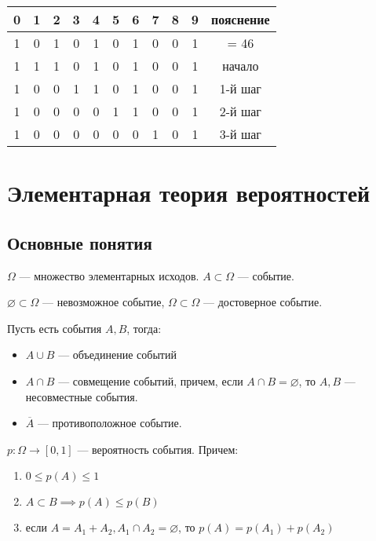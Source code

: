 \begin{eg}
    \begin{tabular}{|c|c|c|c|c|c|c|c|c|c|c|}
        \hline
        0 & 1 & 2 &3 &4&5&6&7&8&9& пояснение\\
        \hline
        1 & 0 & 1 & 0 & 1 & 0 & 1 & 0 & 0 & 1 & = 46\\
        1 & 1 & 1 & 0 & 1 & 0 & 1 & 0 & 0 & 1 & начало\\
        1 & 0 & 0 & 1 & 1 & 0 & 1 & 0 & 0 & 1 & 1-й шаг\\
        1 & 0 & 0 & 0 & 0 & 1 & 1 & 0 & 0 & 1 & 2-й шаг\\
        1 & 0 & 0 & 0 & 0 & 0 & 0 & 1 & 0 & 1 & 3-й шаг\\
        \hline        
    \end{tabular}
\end{eg}

\chapter{Элементарная теория вероятностей}

\section{Основные понятия}
\begin{definition}
    $\Omega$ --- множество элементарных исходов. $A \subset \Omega$ --- событие.
\end{definition}

\begin{definition}
    $\varnothing \subset \Omega$ --- невозможное событие, $\Omega \subset \Omega$ --- достоверное событие.
\end{definition}

\begin{definition}
    Пусть есть события $A, B$, тогда:
    \begin{itemize}
        \item $A \cup B$ --- объединение событий
        \item $A \cap B$ --- совмещение событий, причем, если $A \cap B = \varnothing$, то $A, B$ --- несовместные события.
        \item $\overline{A}$ --- противоположное событие.
    \end{itemize}
\end{definition}

\begin{definition}
    $p: \Omega \to [0, 1]$ --- вероятность события. Причем:
    \begin{enumerate}
        \item $0 \leq p(A) \leq 1$
        \item $A \subset B \implies p(A) \leq p(B)$
        \item если $A = A_1 + A_2, A_1 \cap A_2 = \varnothing$, то $p(A) = p(A_1) + p(A_2)$
    \end{enumerate}
\end{definition}

